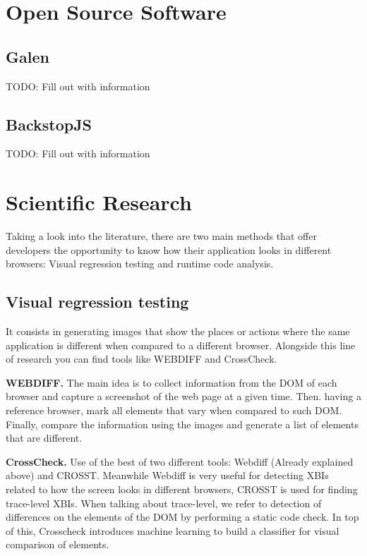 \section{Open Source Software}

\subsection{Galen}

TODO: Fill out with information

\subsection{BackstopJS}

TODO: Fill out with information

\section{Scientific Research}

Taking a look into the literature, there are two main methods that offer developers the opportunity to know how their application looks in different browsers: Visual regression testing and runtime code analysis. 

\subsection{Visual regression testing}

It consists in generating images that show the places or actions where the same application is different when compared to a different browser. Alongside this line of research you can find tools like WEBDIFF and CrossCheck.

\textbf{WEBDIFF.} The main idea is to collect information from the DOM of each browser and capture a screenshot of the web page at a given time. Then. having a reference browser, mark all elements that vary when compared to such DOM. Finally, compare the information using the images and generate a list of elements that are different. 

\textbf{CrossCheck.} Use of the best of two different tools: Webdiff (Already explained above) and CROSST. Meanwhile Webdiff is very useful for detecting XBIs related to how the screen looks in different browsers, CROSST is used for finding trace-level XBIs. When talking about trace-level, we refer to detection of differences on the elements of the DOM by performing a static code check. In top of this, Crosscheck introduces machine learning to build a classifier for visual comparison of elements. 





